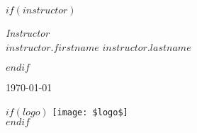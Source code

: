 \begin{titlepage}
	
	\vfill

    $if(instructor)$
	\begin{minipage}{0.4\textwidth}
		\begin{flushright}
			\large
			\textit{Instructor}\\
			$instructor.firstname$ \textsc{$instructor.lastname$}
		\end{flushright}
	\end{minipage}
    $endif$

    \vfill\vfill %
	
	{\large\today} %
	
	
    $if(logo)$
	\vfill\vfill
	\texttt{[image: \$logo\$]}\\[1cm] %
    $endif$
	 
	
	\vfill %
	
\end{titlepage}




